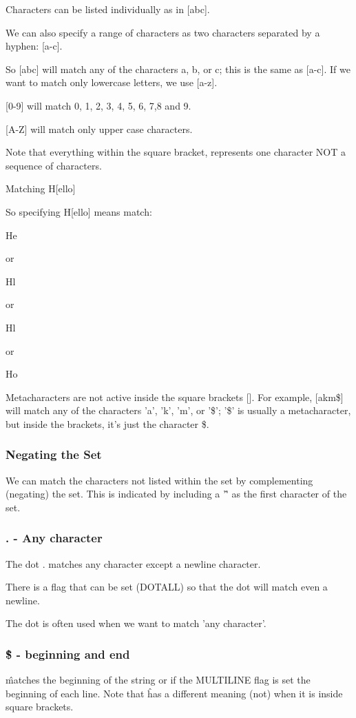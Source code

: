 \documentclass{article}
\begin{document}
Characters can be listed individually as in [abc]. 

We can also specify a range of characters as two characters separated by a hyphen: [a-c]. 

So [abc] will match any of the characters a, b, or c; this is the same as [a-c]. If we want to match only lowercase letters, we use [a-z].

[0-9] will match 0, 1, 2, 3, 4, 5, 6, 7,8 and 9.

[A-Z] will match only upper case characters.

Note that everything within the square bracket, represents one character NOT a sequence of characters.

Matching H[ello]

So specifying H[ello] means match: 

He

or

Hl 

or 

Hl

or

Ho

 

Metacharacters are not active inside the square brackets []. For example, [akm\$] will match any of the characters 'a', 'k', 'm', or '\$'; '\$' is usually a metacharacter, but inside the brackets, it’s just the character \$.

\subsubsection{Negating the Set}
We can match the characters not listed within the set by complementing (negating) the set. This is indicated by including a '\^' as the first character of the set.  


\subsubsection{ . - Any character}
The dot . matches any character except a newline character.  

There is a flag that can be set (DOTALL) so that the dot will match even a newline. 

The dot is often used when we want to match 'any character'.

\subsubsection{\^ \$  - beginning and end} 
\^ matches the beginning of the string or if the MULTILINE flag is set the beginning of each line.  Note that \^ has a different meaning (not) when it is inside square brackets.
\end{document}
